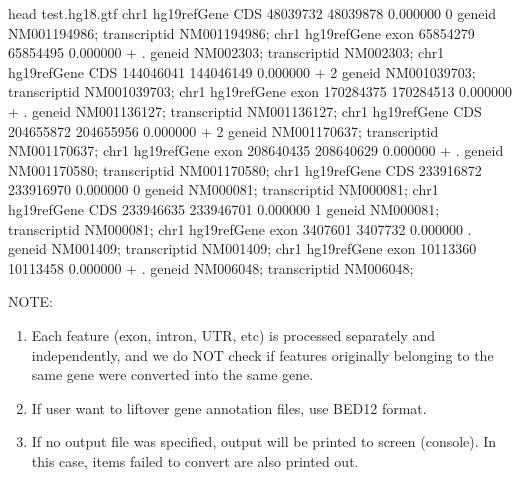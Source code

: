 \documentclass[letterpaper,10pt,english]{sphinxmanual}
\begin{document}
\begin{sphinxVerbatim}[commandchars=\\\{\}]
\PYGZdl{} head test.hg18.gtf
chr1   hg19\PYGZus{}refGene    CDS     48039732        48039878        0.000000        \PYGZhy{}       0       gene\PYGZus{}id \PYGZdq{}NM\PYGZus{}001194986\PYGZdq{}; transcript\PYGZus{}id \PYGZdq{}NM\PYGZus{}001194986\PYGZdq{};
chr1   hg19\PYGZus{}refGene    exon    65854279        65854495        0.000000        +       .       gene\PYGZus{}id \PYGZdq{}NM\PYGZus{}002303\PYGZdq{}; transcript\PYGZus{}id \PYGZdq{}NM\PYGZus{}002303\PYGZdq{};
chr1   hg19\PYGZus{}refGene    CDS     144046041       144046149       0.000000        +       2       gene\PYGZus{}id \PYGZdq{}NM\PYGZus{}001039703\PYGZdq{}; transcript\PYGZus{}id \PYGZdq{}NM\PYGZus{}001039703\PYGZdq{};
chr1   hg19\PYGZus{}refGene    exon    170284375       170284513       0.000000        +       .       gene\PYGZus{}id \PYGZdq{}NM\PYGZus{}001136127\PYGZdq{}; transcript\PYGZus{}id \PYGZdq{}NM\PYGZus{}001136127\PYGZdq{};
chr1   hg19\PYGZus{}refGene    CDS     204655872       204655956       0.000000        +       2       gene\PYGZus{}id \PYGZdq{}NM\PYGZus{}001170637\PYGZdq{}; transcript\PYGZus{}id \PYGZdq{}NM\PYGZus{}001170637\PYGZdq{};
chr1   hg19\PYGZus{}refGene    exon    208640435       208640629       0.000000        +       .       gene\PYGZus{}id \PYGZdq{}NM\PYGZus{}001170580\PYGZdq{}; transcript\PYGZus{}id \PYGZdq{}NM\PYGZus{}001170580\PYGZdq{};
chr1   hg19\PYGZus{}refGene    CDS     233916872       233916970       0.000000        \PYGZhy{}       0       gene\PYGZus{}id \PYGZdq{}NM\PYGZus{}000081\PYGZdq{}; transcript\PYGZus{}id \PYGZdq{}NM\PYGZus{}000081\PYGZdq{};
chr1   hg19\PYGZus{}refGene    CDS     233946635       233946701       0.000000        \PYGZhy{}       1       gene\PYGZus{}id \PYGZdq{}NM\PYGZus{}000081\PYGZdq{}; transcript\PYGZus{}id \PYGZdq{}NM\PYGZus{}000081\PYGZdq{};
chr1   hg19\PYGZus{}refGene    exon    3407601 3407732 0.000000        \PYGZhy{}       .       gene\PYGZus{}id \PYGZdq{}NM\PYGZus{}001409\PYGZdq{}; transcript\PYGZus{}id \PYGZdq{}NM\PYGZus{}001409\PYGZdq{};
chr1   hg19\PYGZus{}refGene    exon    10113360        10113458        0.000000        +       .       gene\PYGZus{}id \PYGZdq{}NM\PYGZus{}006048\PYGZdq{}; transcript\PYGZus{}id \PYGZdq{}NM\PYGZus{}006048\PYGZdq{};
\end{sphinxVerbatim}

NOTE:
\begin{enumerate}
\item {} 
Each feature  (exon, intron, UTR, etc) is processed separately and independently, and
we do NOT check if features originally belonging to the same gene were converted into the same gene.

\item {} 
If user want to liftover gene annotation files, use BED12 format.

\item {} 
If no output file was specified, output will be printed to screen (console). In this case, items failed to convert are also printed out.

\end{enumerate}
\end{document}
